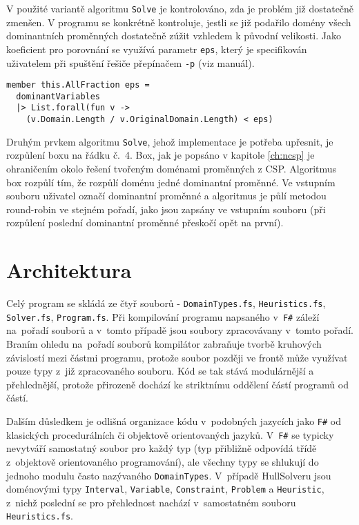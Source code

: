 V použité variantě algoritmu \verb|Solve| je kontrolováno, zda je problém již dostatečně zmenšen. V programu se konkrétně kontroluje, jestli se již podařilo domény všech dominantních proměnných dostatečně zúžit vzhledem k původní velikosti. Jako koeficient pro porovnání se využívá parametr \verb|eps|, který je specifikován uživatelem při spuštění řešiče přepínačem \verb|-p| (viz manuál).

\begin{Verbatim}[samepage=true]
member this.AllFraction eps =
  dominantVariables 
  |> List.forall(fun v -> 
    (v.Domain.Length / v.OriginalDomain.Length) < eps)
\end{Verbatim}


Druhým prvkem algoritmu \verb|Solve|, jehož implementace je potřeba upřesnit, je rozpůlení boxu na řádku č.~4. Box, jak je popsáno v kapitole \ref{ch:ncsp} je ohraničením okolo řešení tvořeným doménami proměnných z CSP. Algoritmus box rozpůlí tím, že rozpůlí doménu jedné dominantní proměnné. Ve vstupním souboru uživatel označí dominantní proměnné a algoritmus je půlí metodou round-robin ve stejném pořadí, jako jsou zapsány ve vstupním souboru (při rozpůlení poslední dominantní proměnné přeskočí opět na první).


\section{Architektura}
Celý program se skládá ze čtyř souborů - \verb|DomainTypes.fs|, \verb|Heuristics.fs|, \verb|Solver.fs|, \verb|Program.fs|. Při kompilování programu napsaného v~\texttt{F\#} záleží na~pořadí souborů a v~tomto případě jsou soubory zpracovávany v~tomto pořadí. Braním ohledu na~pořadí souborů kompilátor zabraňuje tvorbě kruhových závislostí mezi částmi programu, protože soubor později ve frontě může využívat pouze typy z~již zpracovaného souboru. Kód se tak stává modulárnější a přehlednější, protože přirozeně dochází ke striktnímu oddělení  částí programů od  částí.

Dalším důsledkem je odlišná organizace kódu v~podobných jazycích jako \texttt{F\#} od klasických procedurálních či objektově orientovaných jazyků. V~\texttt{F\#} se typicky nevytváří samostatný soubor pro každý typ (typ přibližně odpovídá třídě z~objektově orientovaného programování), ale všechny typy se shlukují do jednoho modulu často nazývaného \verb|DomainTypes|. V~případě HullSolveru jsou doménovými typy \verb|Interval|, \verb|Variable|, \verb|Constraint|, \verb|Problem| a \verb|Heuristic|, z~nichž poslední se pro přehlednost nachází v~samostatném souboru \verb|Heuristics.fs|.

